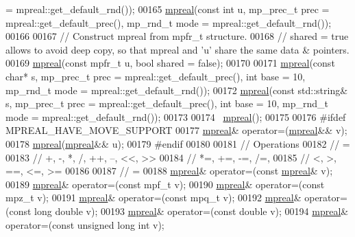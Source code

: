 \begin{DoxyCode}
       = mpreal::get\_default\_rnd());
00165     \hyperlink{classmpfr_1_1mpreal}{mpreal}(\textcolor{keyword}{const} \textcolor{keywordtype}{int} u,                    mp\_prec\_t prec = mpreal::get\_default\_prec(), mp\_rnd\_t mode
       = mpreal::get\_default\_rnd());
00166 
00167     \textcolor{comment}{// Construct mpreal from mpfr\_t structure.}
00168     \textcolor{comment}{// shared = true allows to avoid deep copy, so that mpreal and 'u' share the same data & pointers.}
00169     \hyperlink{classmpfr_1_1mpreal}{mpreal}(\textcolor{keyword}{const} mpfr\_t  u, \textcolor{keywordtype}{bool} shared = \textcolor{keyword}{false});
00170 
00171     \hyperlink{classmpfr_1_1mpreal}{mpreal}(\textcolor{keyword}{const} \textcolor{keywordtype}{char}* s,             mp\_prec\_t prec = mpreal::get\_default\_prec(), \textcolor{keywordtype}{int} base = 10, 
      mp\_rnd\_t mode = mpreal::get\_default\_rnd());
00172     \hyperlink{classmpfr_1_1mpreal}{mpreal}(\textcolor{keyword}{const} std::string& s,      mp\_prec\_t prec = mpreal::get\_default\_prec(), \textcolor{keywordtype}{int} base = 10, 
      mp\_rnd\_t mode = mpreal::get\_default\_rnd());
00173 
00174     ~\hyperlink{classmpfr_1_1mpreal}{mpreal}();
00175 
00176 \textcolor{preprocessor}{#ifdef MPREAL\_HAVE\_MOVE\_SUPPORT}
00177     \hyperlink{classmpfr_1_1mpreal}{mpreal}& operator=(\hyperlink{classmpfr_1_1mpreal}{mpreal}&& v);
00178     \hyperlink{classmpfr_1_1mpreal}{mpreal}(\hyperlink{classmpfr_1_1mpreal}{mpreal}&& u);
00179 \textcolor{preprocessor}{#endif}
00180 
00181     \textcolor{comment}{// Operations}
00182     \textcolor{comment}{// =}
00183     \textcolor{comment}{// +, -, *, /, ++, --, <<, >>}
00184     \textcolor{comment}{// *=, +=, -=, /=,}
00185     \textcolor{comment}{// <, >, ==, <=, >=}
00186 
00187     \textcolor{comment}{// =}
00188     \hyperlink{classmpfr_1_1mpreal}{mpreal}& operator=(\textcolor{keyword}{const} \hyperlink{classmpfr_1_1mpreal}{mpreal}& v);
00189     \hyperlink{classmpfr_1_1mpreal}{mpreal}& operator=(\textcolor{keyword}{const} mpf\_t v);
00190     \hyperlink{classmpfr_1_1mpreal}{mpreal}& operator=(\textcolor{keyword}{const} mpz\_t v);
00191     \hyperlink{classmpfr_1_1mpreal}{mpreal}& operator=(\textcolor{keyword}{const} mpq\_t v);
00192     \hyperlink{classmpfr_1_1mpreal}{mpreal}& operator=(\textcolor{keyword}{const} \textcolor{keywordtype}{long} \textcolor{keywordtype}{double} v);
00193     \hyperlink{classmpfr_1_1mpreal}{mpreal}& operator=(\textcolor{keyword}{const} \textcolor{keywordtype}{double} v);
00194     \hyperlink{classmpfr_1_1mpreal}{mpreal}& operator=(\textcolor{keyword}{const} \textcolor{keywordtype}{unsigned} \textcolor{keywordtype}{long} \textcolor{keywordtype}{int} v);

\end{DoxyCode}
